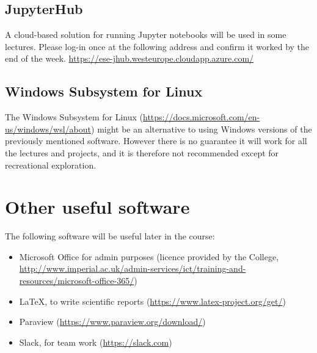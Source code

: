 \documentclass[11pt]{article}
\begin{document}
\subsection{JupyterHub}

A cloud-based solution for running Jupyter notebooks will be used in some lectures. Please log-in once at the following address and confirm it worked by the end of the week.
\url{https://ese-jhub.westeurope.cloudapp.azure.com/}


\subsection{Windows Subsystem for Linux}

The Windows Subsystem for Linux (\url{https://docs.microsoft.com/en-us/windows/wsl/about}) might be an alternative to using Windows versions of the previously mentioned software. 
However there is no guarantee it will work for all the lectures and projects, and it is therefore not recommended except for recreational exploration.


\section{Other useful software}

The following software will be useful later in the course:
\begin{itemize}
  \item Microsoft Office for admin purposes (licence provided by the College, \url{http://www.imperial.ac.uk/admin-services/ict/training-and-resources/microsoft-office-365/})
  \item LaTeX, to write scientific reports (\url{https://www.latex-project.org/get/})
  \item Paraview (\url{https://www.paraview.org/download/})
  \item Slack, for team work (\url{https://slack.com})
\end{itemize}
\end{document}
